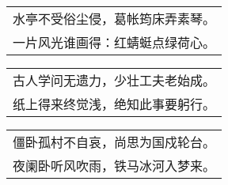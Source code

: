 \nopagebreak%
\nopagebreak%
\noindent\begin{minipage}{\linewidth}
  \vskip-3pt\begin{table}[H]
    \centering
    \begin{tabular}{@{}l@{}}
水亭不受俗尘侵，葛帐筠床弄素琴。\\
一片风光谁画得：红蜻蜓点绿荷心。
    \end{tabular}
  \end{table}
\end{minipage}
\vspace{1cm}


\nopagebreak%
\nopagebreak%
\noindent\begin{minipage}{\linewidth}
  \vskip-3pt\begin{table}[H]
    \centering
    \begin{tabular}{@{}l@{}}
古人学问无遗力，少壮工夫老始成。\\
纸上得来终觉浅，绝知此事要躬行。
    \end{tabular}
  \end{table}
\end{minipage}
\vspace{1cm}


\nopagebreak%
\nopagebreak%
\noindent\begin{minipage}{\linewidth}
  \vskip-3pt\begin{table}[H]
    \centering
    \begin{tabular}{@{}l@{}}
僵卧孤村不自哀，尚思为国戍轮台。\\
夜阑卧听风吹雨，铁马冰河入梦来。
    \end{tabular}
  \end{table}
\end{minipage}
\vspace{1cm}


